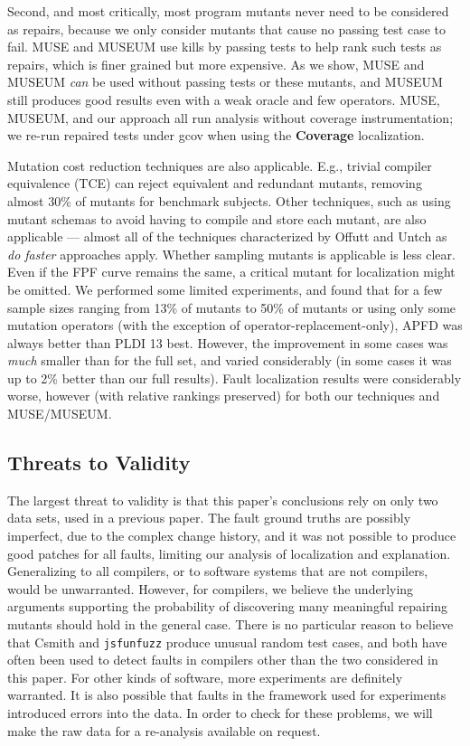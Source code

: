 Second, and most critically, most program mutants never need to be considered as repairs, because we only consider mutants that cause no passing test case to fail.  MUSE and MUSEUM use kills by passing tests to help rank such tests as repairs, which is finer grained but more expensive.  As we show, MUSE and MUSEUM \emph{can}  be used without passing tests or these mutants, and MUSEUM still produces good results even with a weak oracle and few operators.  MUSE, MUSEUM, and our approach all run analysis without coverage instrumentation; we re-run repaired tests under gcov when using the {\bf Coverage} localization.

Mutation cost reduction techniques are also applicable.  E.g., trivial compiler equivalence (TCE) \cite{TCE} can reject equivalent and redundant mutants, removing almost 30\% of mutants for benchmark subjects. Other techniques, such as using mutant schemas to avoid having to compile and store each mutant, are also applicable --- almost all of the techniques characterized by Offutt and Untch \cite{offutt2001mutation} as \emph{do faster} approaches apply.   Whether sampling mutants \cite{RahulISSRE} is applicable is less clear.  Even if the FPF curve remains the same, a critical mutant for localization might be omitted.  We performed some limited experiments, and found that for a few sample sizes ranging from 13\% of mutants to 50\% of mutants or using only some mutation operators (with the exception of operator-replacement-only), APFD was always better than PLDI 13 best.   However, the improvement in some cases was \emph{much} smaller than for the full set, and varied considerably (in some cases it was up to 2\% better than our full results).  Fault localization results were considerably worse, however (with relative rankings preserved) for both our techniques and MUSE/MUSEUM.

\subsection{Threats to Validity}

The largest threat to validity is that this paper's conclusions rely on only two data sets, used in a previous paper.  The fault ground truths are possibly imperfect, due to the complex change history, and it was not possible to produce good patches for all faults, limiting our analysis of localization and explanation.  Generalizing to all compilers, or to software systems that are not compilers, would be unwarranted.  However, for compilers, we believe the underlying arguments supporting the probability of discovering many meaningful repairing mutants should hold in the general case.  There is no particular reason to believe that Csmith and {\tt jsfunfuzz} produce unusual random test cases, and both have often been used to detect faults in compilers other than the two considered in this paper.  For other kinds of software, more experiments are definitely warranted.  It is also possible that faults in the framework used for experiments introduced errors into the data.  In order to check for these problems, we will make the raw data for a re-analysis available on request.

